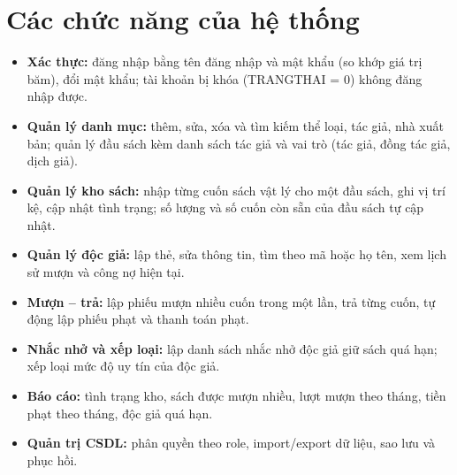 \documentclass[13pt,a4paper,oneside]{extreport}
\begin{document}
\section{Các chức năng của hệ thống}
\begin{itemize}
\item \textbf{Xác thực:} đăng nhập bằng tên đăng nhập và mật khẩu (so khớp giá trị băm), đổi mật khẩu; tài khoản bị khóa (TRANGTHAI = 0) không đăng nhập được.
\item \textbf{Quản lý danh mục:} thêm, sửa, xóa và tìm kiếm thể loại, tác giả, nhà xuất bản; quản lý đầu sách kèm danh sách tác giả và vai trò (tác giả, đồng tác giả, dịch giả).
\item \textbf{Quản lý kho sách:} nhập từng cuốn sách vật lý cho một đầu sách, ghi vị trí kệ, cập nhật tình trạng; số lượng và số cuốn còn sẵn của đầu sách tự cập nhật.
\item \textbf{Quản lý độc giả:} lập thẻ, sửa thông tin, tìm theo mã hoặc họ tên, xem lịch sử mượn và công nợ hiện tại.
\item \textbf{Mượn -- trả:} lập phiếu mượn nhiều cuốn trong một lần, trả từng cuốn, tự động lập phiếu phạt và thanh toán phạt.
\item \textbf{Nhắc nhở và xếp loại:} lập danh sách nhắc nhở độc giả giữ sách quá hạn; xếp loại mức độ uy tín của độc giả.
\item \textbf{Báo cáo:} tình trạng kho, sách được mượn nhiều, lượt mượn theo tháng, tiền phạt theo tháng, độc giả quá hạn.
\item \textbf{Quản trị CSDL:} phân quyền theo role, import/export dữ liệu, sao lưu và phục hồi.
\end{itemize}
\end{document}
